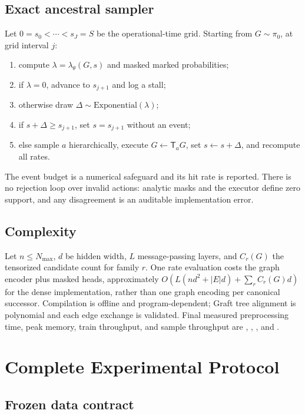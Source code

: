 \documentclass{article}
\newcommand{\pzero}{\pi_0}
\newcommand{\T}{\mathsf{T}}
\theoremstyle{definition}
\theoremstyle{remark}
\begin{document}
\subsection{Exact ancestral sampler}\label{app:sampler}

Let $0=s_0<\cdots<s_J=S$ be the operational-time grid. Starting from $G\sim\pzero$, at grid interval $j$:
\begin{enumerate}[leftmargin=*]
    \item compute $\lambda=\lambda_\theta(G,s)$ and masked marked probabilities;
    \item if $\lambda=0$, advance to $s_{j+1}$ and log a stall;
    \item otherwise draw $\Delta\sim\mathrm{Exponential}(\lambda)$;
    \item if $s+\Delta\ge s_{j+1}$, set $s=s_{j+1}$ without an event;
    \item else sample $a$ hierarchically, execute $G\leftarrow\T_aG$, set $s\leftarrow s+\Delta$, and recompute all rates.
\end{enumerate}
The event budget is a numerical safeguard and its hit rate is reported. There is no rejection loop over invalid actions: analytic masks and the executor define zero support, and any disagreement is an auditable implementation error.

\subsection{Complexity}

Let $n\le N_{\max}$, $d$ be hidden width, $L$ message-passing layers, and $C_r(G)$ the tensorized candidate count for family $r$. One rate evaluation costs the graph encoder plus masked heads, approximately $O(L(n d^2+|E|d)+\sum_r C_r(G)d)$ for the dense implementation, rather than one graph encoding per canonical successor. Compilation is offline and program-dependent; Graft tree alignment is polynomial and each edge exchange is validated. Final measured preprocessing time, peak memory, train throughput, and sample throughput are \ComposeTrainHours, \ComposePeakMemory, \XXX, and \ComposeThroughput.

\section{Complete Experimental Protocol}\label{app:experiments}

\subsection{Frozen data contract}
\end{document}
